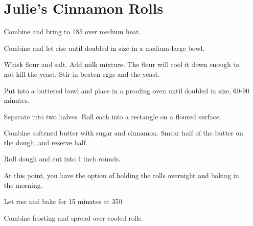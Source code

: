 \section{Julie's Cinnamon Rolls}
\begin{recipe}



Combine and bring to 185\degree{} over medium heat.


Combine and let rise until doubled in size in a medium-large bowl.


Whisk flour and salt. Add milk mixture. The flour will cool it down enough 
to not kill the yeast. Stir in beaten eggs and the yeast. 

Put into a buttered bowl and place in a proofing oven until doubled in size, 
60-90 minutes. 

Separate into two halves. Roll each into a rectangle on 
a floured surface. 


Combine softened butter with sugar and cinnamon.
Smear half of the butter on the dough, and reserve half. 

Roll dough and cut into 1 inch rounds. 

At this point, you have the option of holding the rolls overnight 
and baking in the morning.

Let rise and bake for 15 minutes at 350\degree{}.


Combine frosting and spread over cooled rolls. 

\end{recipe}
